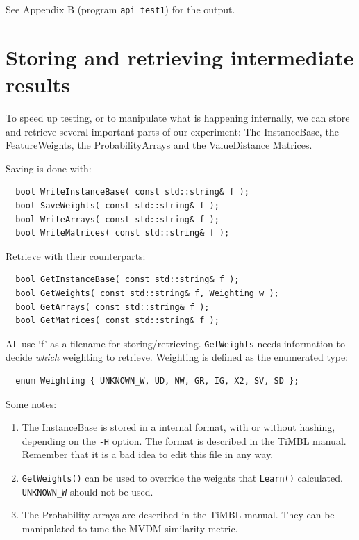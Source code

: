 \documentclass{report}
\begin{document}
See Appendix B (program {\tt api\_test1}) for the output.

\section{Storing and retrieving intermediate results}

To speed up testing, or to manipulate what is happening internally, we
can store and retrieve several important parts of our experiment: The
InstanceBase, the FeatureWeights, the ProbabilityArrays and the ValueDistance Matrices.

Saving is done with:

\begin{footnotesize}
\begin{verbatim}
  bool WriteInstanceBase( const std::string& f );
  bool SaveWeights( const std::string& f );
  bool WriteArrays( const std::string& f );
  bool WriteMatrices( const std::string& f );
\end{verbatim}
\end{footnotesize}

Retrieve with their counterparts:

\begin{footnotesize}
\begin{verbatim}
  bool GetInstanceBase( const std::string& f );
  bool GetWeights( const std::string& f, Weighting w );
  bool GetArrays( const std::string& f );
  bool GetMatrices( const std::string& f );
\end{verbatim}
\end{footnotesize}

All use `f' as a filename for storing/retrieving. {\tt GetWeights} needs
information to decide {\em which}\/ weighting to retrieve.
Weighting is defined as the enumerated type:

\begin{footnotesize}
\begin{verbatim}
  enum Weighting { UNKNOWN_W, UD, NW, GR, IG, X2, SV, SD };
\end{verbatim}
\end{footnotesize}

Some notes:

\begin{enumerate}
\item The InstanceBase is stored in a internal format, with or without
hashing, depending on the {\tt -H} option. The format is described in the
TiMBL manual. Remember that it is a bad idea to edit this file in any way.
\item {\tt GetWeights()} can be used to override the weights that
{\tt Learn()} calculated. {\tt UNKNOWN\_W} should not be used.
\item The Probability arrays are described in the TiMBL manual. They can be
manipulated to tune the MVDM similarity metric.
\end{enumerate}
\end{document}
